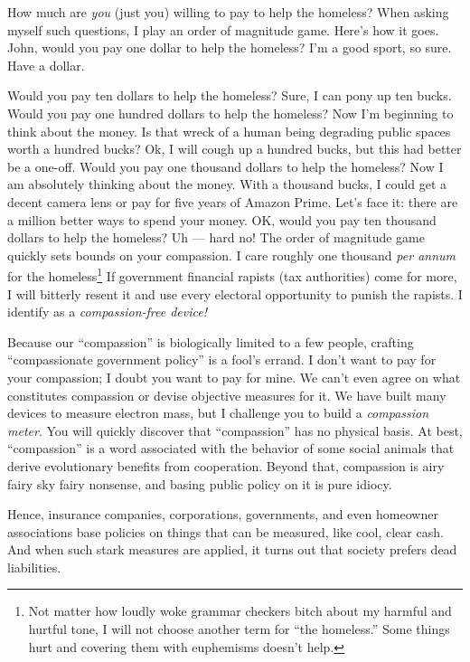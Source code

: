 How much are \emph{you} (just you) willing to pay to help the homeless?
When asking myself such questions, I play an order of magnitude game.
Here's how it goes. John, would you pay one dollar to help the homeless?
I'm a good sport, so sure. Have a dollar.

Would you pay ten dollars to help the homeless? Sure, I can pony up ten
bucks. Would you pay one hundred dollars to help the homeless? Now I'm
beginning to think about the money. Is that wreck of a human being
degrading public spaces worth a hundred bucks? Ok, I will cough up a
hundred bucks, but this had better be a one-off. Would you pay one
thousand dollars to help the homeless? Now I am absolutely thinking
about the money. With a thousand bucks, I could get a decent camera lens
or pay for five years of Amazon Prime. Let's face it: there are a
million better ways to spend your money. OK, would you pay ten thousand
dollars to help the homeless? Uh --- hard no! The order of magnitude
game quickly sets bounds on your compassion. I care roughly one thousand
\emph{per annum} for the
homeless\footnote{Not matter how loudly woke grammar checkers bitch about my harmful and
hurtful tone, I will not choose another term for ``the homeless.''
Some things hurt and covering them with euphemisms doesn't help.} %
If government financial rapists (tax authorities) come for more, I will
bitterly resent it and use every electoral opportunity to punish the
rapists. I identify as a \emph{compassion-free device!}

Because our ``compassion'' is biologically limited to a few people,
crafting ``compassionate government policy'' is a fool's errand. I don't
want to pay for your compassion; I doubt you want to pay for mine. We
can't even agree on what constitutes compassion or devise objective
measures for it. We have built many devices to measure electron mass,
but I challenge you to build a \emph{compassion meter}. You will quickly
discover that ``compassion'' has no physical basis. At best,
``compassion'' is a word associated with the behavior of some social
animals that derive evolutionary benefits from cooperation. Beyond that,
compassion is airy fairy sky fairy nonsense, and basing public policy on
it is pure idiocy.

Hence, insurance companies, corporations, governments, and even
homeowner associations base policies on things that can be measured,
like cool, clear cash. And when such stark measures are applied, it
turns out that society prefers dead liabilities.

%



%

